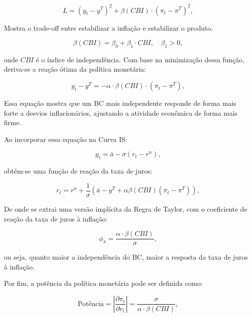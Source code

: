 \documentclass[a4paper,12pt]{article}
\begin{document}
\begin{equation}
L = (y_t - y^T)^2 + \beta(CBI) \cdot (\pi_t - \pi^T)^2,
\label{eq:loss_beta}
\end{equation}

Mostra o trade-off entre estabilizar a inflação e estabilizar o produto. 

\begin{equation}
\beta(CBI) = \beta_0 + \beta_1 \cdot CBI, \quad \beta_1 > 0,
\label{eq:beta_function}
\end{equation}

\noindent onde $CBI$ é o índice de independência. Com base na minimização dessa função, deriva-se a reação ótima da política monetária:

\begin{equation}
y_t - y^T = - \alpha \cdot \beta(CBI) \cdot (\pi_t - \pi^T),
\label{eq:optimal_response}
\end{equation}

\noindent Essa equação mostra que um BC mais independente responde de forma mais forte a desvios inflacionários, ajustando a atividade econômica de forma mais firme.

Ao incorporar essa equação na Curva IS:

\begin{equation}
y_t = \bar{a} - \sigma (r_t - r^n),
\label{eq:curve_is}
\end{equation}

\noindent obtém-se uma função de reação da taxa de juros:

\begin{equation}
r_t = r^n + \frac{1}{\sigma}(\bar{a} - y^T + \alpha \beta(CBI)(\pi_t - \pi^T)),
\label{eq:reaction_function}
\end{equation}

\noindent De onde se extrai uma versão implícita da Regra de Taylor, com o coeficiente de reação da taxa de juros à inflação:

\begin{equation}
\phi_\pi = \frac{\alpha \cdot \beta(CBI)}{\sigma},
\label{eq:phi_pi}
\end{equation}

\noindent ou seja, quanto maior a independência do BC, maior a resposta da taxa de juros à inflação.

Por fim, a potência da política monetária pode ser definida como:

\begin{equation}
\text{Potência} = \left| \frac{\partial \pi_t}{\partial r_t} \right| = \frac{\sigma}{\alpha \cdot \beta(CBI)},
\label{eq:potencia}
\end{equation}
\end{document}
